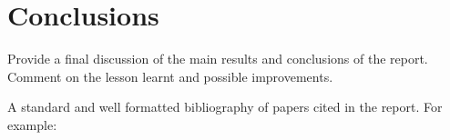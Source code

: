\documentclass[UKenglish]{svproc}
\begin{document}

\section{Conclusions}
Provide a final discussion of the main results and conclusions of the report. Comment on the lesson learnt and possible improvements.


A standard and well formatted bibliography of papers cited in the report. For example:

\printbibliography
\end{document}
